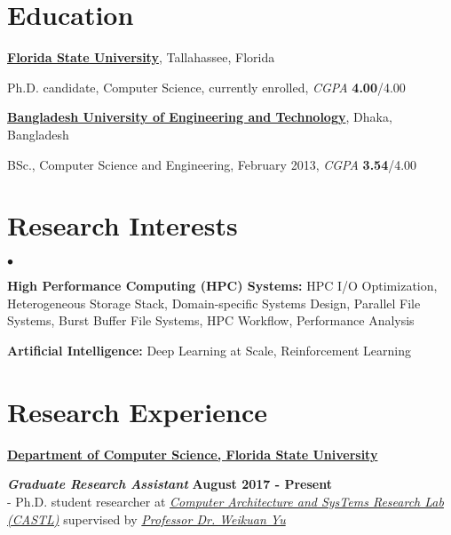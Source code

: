 \documentclass[margin,line]{res}
\newenvironment{list1}{
  \begin{list}{\ding{113}}{%
      \setlength{\itemsep}{0in}
      \setlength{\parsep}{0in} \setlength{\parskip}{0in}
      \setlength{\topsep}{0in} \setlength{\partopsep}{0in} 
      \setlength{\leftmargin}{0.17in}}}{\end{list}}
\newenvironment{list2}{
  \begin{list}{$\bullet$}{%
      \setlength{\itemsep}{0in}
      \setlength{\parsep}{0in} \setlength{\parskip}{0in}
      \setlength{\topsep}{0in} \setlength{\partopsep}{0in} 
      \setlength{\leftmargin}{0.2in}}}{\end{list}}
\begin{document}
\begin{resume}

\section{\sc Education}
{\bf \href{http://www.fsu.edu}{Florida State University}}, Tallahassee, Florida\\
\vspace*{-.15in}
\begin{list1}
\item[] Ph.D. candidate, Computer Science, currently enrolled, \textit{CGPA} \textbf{4.00}/4.00
\end{list1}
\vspace*{-.15in}
{\bf \href{http://buet.ac.bd}{Bangladesh University of Engineering and Technology}}, Dhaka, Bangladesh\\
\vspace*{-.15in}
\begin{list1}
\item[] BSc., Computer Science and Engineering, February 2013, \textit{CGPA} \textbf{3.54}/4.00
\end{list1}

\vspace*{-.1in}

\section{\sc Research Interests}
\begin{list2}
\item \textbf{High Performance Computing (HPC) Systems:} HPC I/O Optimization, Heterogeneous Storage Stack, Domain-specific Systems Design, Parallel File Systems, Burst Buffer File Systems, HPC Workflow, Performance Analysis
\item \textbf{Artificial Intelligence:} Deep Learning at Scale, Reinforcement Learning
\end{list2}

\vspace*{-.1in}

\section{\sc Research Experience}
{\bf \href{http://www.cs.fsu.edu/}{Department of Computer Science, Florida State University}}

\vspace{-.4cm}
\textbf{{\em Graduate Research Assistant}} \hfill {\bf August 2017 - Present}\\
- Ph.D. student researcher at \textit{\href{http://castl.cs.fsu.edu/doku.php/}{Computer Architecture and SysTems Research Lab (CASTL)}} supervised by \textit{\href{https://www.cs.fsu.edu/~yuw/}{Professor Dr. Weikuan Yu}}


\end{resume}
\end{document}
